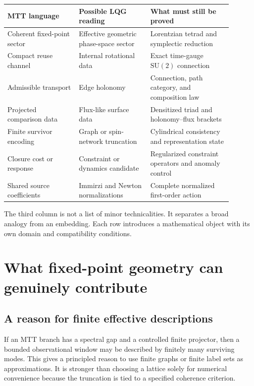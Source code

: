 \documentclass[11pt]{article}
\begin{document}
\begin{center}
\begin{tabular}{p{0.29\linewidth}p{0.29\linewidth}p{0.32\linewidth}}
\hline
MTT language & Possible LQG reading & What must still be proved\\
\hline
Coherent fixed-point sector & Effective geometric phase-space sector &
Lorentzian tetrad and symplectic reduction\\
Compact reuse channel & Internal rotational data & Exact time-gauge
\(\mathrm{SU}(2)\) connection\\
Admissible transport & Edge holonomy & Connection, path category, and
composition law\\
Projected comparison data & Flux-like surface data & Densitized triad and
holonomy--flux brackets\\
Finite survivor encoding & Graph or spin-network truncation & Cylindrical
consistency and representation state\\
Closure cost or response & Constraint or dynamics candidate & Regularized
constraint operators and anomaly control\\
Shared source coefficients & Immirzi and Newton normalizations & Complete
normalized first-order action\\
\hline
\end{tabular}
\end{center}

The third column is not a list of minor technicalities. It separates a broad
analogy from an embedding. Each row introduces a mathematical object with its
own domain and compatibility conditions.

\section{What fixed-point geometry can genuinely contribute}

\subsection{A reason for finite effective descriptions}

If an MTT branch has a spectral gap and a controlled finite projector, then a
bounded observational window may be described by finitely many surviving
modes. This gives a principled reason to use finite graphs or finite label
sets as approximations. It is stronger than choosing a lattice solely for
numerical convenience because the truncation is tied to a specified
coherence criterion.
\end{document}
